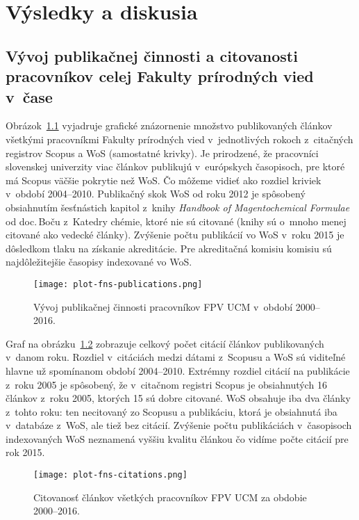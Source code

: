 \chapter{Výsledky a diskusia}

\section{Vývoj publikačnej činnosti a citovanosti pracovníkov celej Fakulty
  prírodných vied v~čase}

Obrázok~\ref{fig:plot.fns.publications} vyjadruje grafické znázornenie množstvo
publikovaných článkov všetkými pracovníkmi Fakulty prírodných vied
v~jednotlivých rokoch z~citačných registrov Scopus a WoS (samostatné krivky).
Je prirodzené, že pracovníci slovenskej univerzity viac článkov publikujú
v~európskych časopisoch, pre ktoré má Scopus väčšie pokrytie než WoS.  Čo môžeme
vidieť ako rozdiel kriviek v~období 2004--2010.  Publikačný skok WoS od roku
2012 je spôsobený obsiahnutím šesťnástich kapitol z~knihy \emph{Handbook of
  Magentochemical Formulae} od doc.\,Boču z~Katedry chémie, ktoré nie sú
citované (knihy sú o~mnoho menej citované ako vedecké články).  Zvýšenie počtu
publikácií vo WoS v~roku 2015 je dôsledkom tlaku na získanie akreditácie.  Pre
akreditačná komisiu komisiu sú najdôležitejšie časopisy indexované vo WoS.

\begin{figure}
  \centering
  \texttt{[image: plot-fns-publications.png]}
  \caption{Vývoj publikačnej činnosti pracovníkov FPV UCM v~období 2000--2016.}
  \label{fig:plot.fns.publications}
\end{figure}

Graf na obrázku~\ref{fig:plot.fns.citations} zobrazuje celkový počet citácií
článkov publikovaných v~danom roku.  Rozdiel v~citáciách medzi dátami z~Scopusu
a WoS sú viditeľné hlavne už spomínanom období 2004--2010.  Extrémny rozdiel
citácií na publikácie z~roku 2005 je spôsobený, že v~citačnom registri Scopus je
obsiahnutých 16 článkov z~roku 2005, ktorých 15 sú dobre citované.  WoS obsahuje
iba dva články z~tohto roku: ten necitovaný zo Scopusu a publikáciu, ktorá je
obsiahnutá iba v~databáze z~WoS, ale tiež bez citácií.  Zvýšenie počtu
publikáciách v~časopisoch indexovaných WoS neznamená vyššiu kvalitu článkou čo
vidíme počte citácií pre rok 2015.

\begin{figure}
  \centering
  \texttt{[image: plot-fns-citations.png]}
  \caption{Citovanosť článkov všetkých pracovníkov FPV UCM za obdobie
    2000--2016.}
  \label{fig:plot.fns.citations}
\end{figure}



